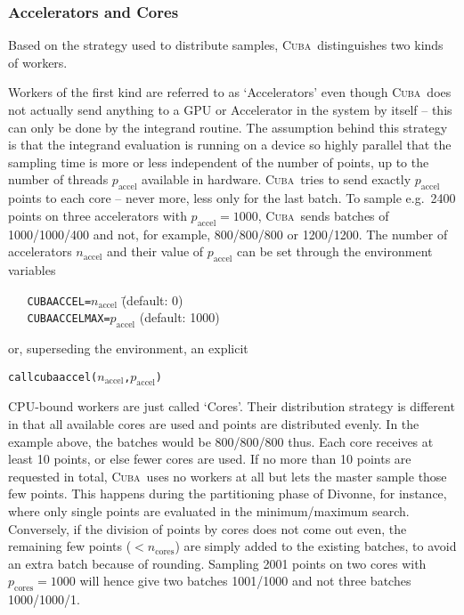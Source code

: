 \documentclass[12pt]{article}
\newcommand\cuba{\textsc{Cuba}}
\newcommand\eg{e.g.\ }
\newcommand\accel{_{\mathrm{accel}}}
\newcommand\cores{_{\mathrm{cores}}}
\begin{document}

\subsubsection{Accelerators and Cores}
\label{sect:cores}

Based on the strategy used to distribute samples, \cuba\ distinguishes 
two kinds of workers.

Workers of the first kind are referred to as `Accelerators' even though 
\cuba\ does not actually send anything to a GPU or Accelerator in the 
system by itself -- this can only be done by the integrand routine.  The 
assumption behind this strategy is that the integrand evaluation is 
running on a device so highly parallel that the sampling time is more or 
less independent of the number of points, up to the number of threads 
$p\accel$ available in hardware.  \cuba\ tries to send exactly $p\accel$ 
points to each core -- never more, less only for the last batch.  To 
sample \eg 2400 points on three accelerators with $p\accel = 1000$, 
\cuba\ sends batches of 1000/1000/400 and not, for example, 800/800/800 
or 1200/1200.  The number of accelerators $n\accel$ and their value of 
$p\accel$ can be set through the environment variables
\begin{tabbing}
\verb|   CUBAACCEL=|$n\accel$ \hspace{10em}\= (default: 0) \\
\verb|   CUBAACCELMAX=|$p\accel$    \> (default: 1000)
\end{tabbing}
or, superseding the environment, an explicit
\begin{alltt}
   call cubaaccel(\(n\accel\), \(p\accel\))
\end{alltt}

CPU-bound workers are just called `Cores'.  Their distribution strategy 
is different in that all available cores are used and points are 
distributed evenly.  In the example above, the batches would be 
800/800/800 thus.  Each core receives at least 10 points, or else fewer 
cores are used.  If no more than 10 points are requested in total, 
\cuba\ uses no workers at all but lets the master sample those few 
points.  This happens during the partitioning phase of Divonne, for 
instance, where only single points are evaluated in the minimum/maximum 
search. Conversely, if the division of points by cores does not come out 
even, the remaining few points ($< n\cores$) are simply added to the 
existing batches, to avoid an extra batch because of rounding.  Sampling 
2001 points on two cores with $p\cores = 1000$ will hence give two 
batches 1001/1000 and not three batches 1000/1000/1.
\end{document}
